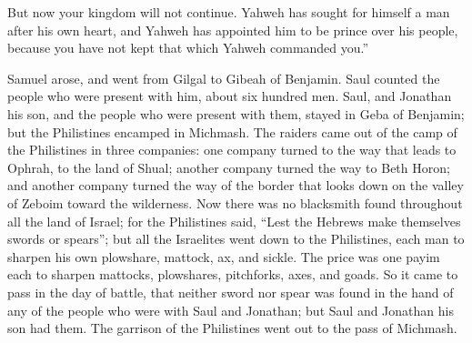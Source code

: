 {But now your kingdom will not continue. Yahweh has sought for himself a man after his own heart, and Yahweh has appointed him to be prince over his people, because you have not kept that which Yahweh commanded you.”
\par }{\PP {}Samuel arose, and went from Gilgal to Gibeah of Benjamin. Saul counted the people who were present with him, about six hundred men.
Saul, and Jonathan his son, and the people who were present with them, stayed in Geba of Benjamin; but the Philistines encamped in Michmash.
The raiders came out of the camp of the Philistines in three companies: one company turned to the way that leads to Ophrah, to the land of Shual;
another company turned the way to Beth Horon; and another company turned the way of the border that looks down on the valley of Zeboim toward the wilderness.
Now there was no blacksmith found throughout all the land of Israel; for the Philistines said, “Lest the Hebrews make themselves swords or spears”;
but all the Israelites went down to the Philistines, each man to sharpen his own plowshare, mattock, ax, and sickle.
The price was one payim each to sharpen mattocks, plowshares, pitchforks, axes, and goads.
So it came to pass in the day of battle, that neither sword nor spear was found in the hand of any of the people who were with Saul and Jonathan; but Saul and Jonathan his son had them.
The garrison of the Philistines went out to the pass of Michmash.

}
